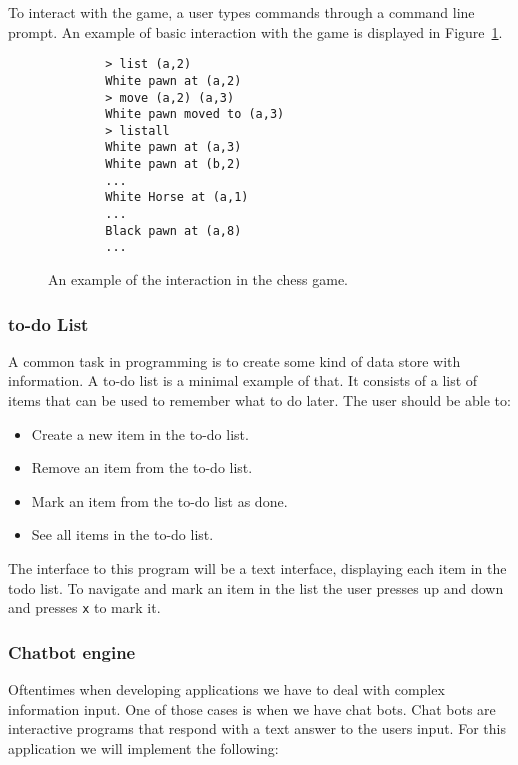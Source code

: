 \documentclass[12pt]{article}
\theoremstyle{definition}
\theoremstyle{theorem}
\begin{document}
To interact with the game, a user types commands through a command line prompt.
An example of basic interaction with the game is displayed in
Figure~\ref{chessexample}.

\begin{figure}[H]
    \centering
    \begin{lstlisting}
        > list (a,2)
        White pawn at (a,2)
        > move (a,2) (a,3)
        White pawn moved to (a,3)
        > listall
        White pawn at (a,3)
        White pawn at (b,2)
        ...
        White Horse at (a,1)
        ...
        Black pawn at (a,8)
        ...
    \end{lstlisting}
    \label{chessexample}
    \caption{An example of the interaction in the chess game.}
\end{figure}


\subsubsection{to-do List}

A common task in programming is to create some kind of data store with
information. A to-do list is a minimal example of that. It consists of a list of
items that can be used to remember what to do later. The user should be able to:

\begin{itemize}
    \item Create a new item in the to-do list.
    \item Remove an item from the to-do list.
    \item Mark an item from the to-do list as done.
    \item See all items in the to-do list.
\end{itemize}

The interface to this program will be a text interface, displaying each item in
the todo list. To navigate and mark an item in the list the user presses up and
down and presses \texttt{x} to mark it.

\subsubsection{Chatbot engine}

Oftentimes when developing applications we have to deal with complex information
input. One of those cases is when we have chat bots. Chat bots are interactive
programs that respond with a text answer to the users input. For this
application we will implement the following:
\end{document}
